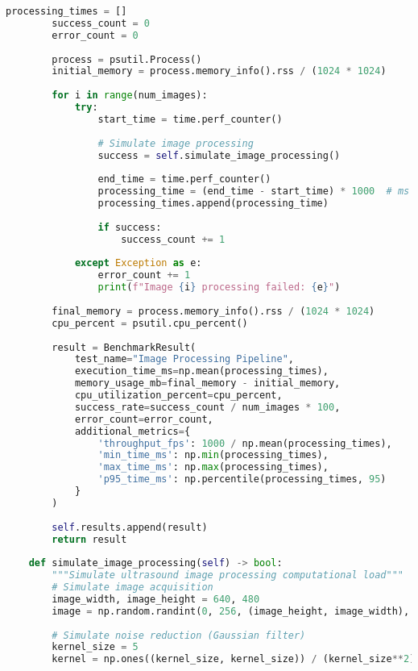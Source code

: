 \begin{lstlisting}[language=Python, caption={Performance Benchmark Script}, label={lst:app-benchmark-script}]
        processing_times = []
        success_count = 0
        error_count = 0
        
        process = psutil.Process()
        initial_memory = process.memory_info().rss / (1024 * 1024)
        
        for i in range(num_images):
            try:
                start_time = time.perf_counter()
                
                # Simulate image processing
                success = self.simulate_image_processing()
                
                end_time = time.perf_counter()
                processing_time = (end_time - start_time) * 1000  # ms
                processing_times.append(processing_time)
                
                if success:
                    success_count += 1
                    
            except Exception as e:
                error_count += 1
                print(f"Image {i} processing failed: {e}")
        
        final_memory = process.memory_info().rss / (1024 * 1024)
        cpu_percent = psutil.cpu_percent()
        
        result = BenchmarkResult(
            test_name="Image Processing Pipeline",
            execution_time_ms=np.mean(processing_times),
            memory_usage_mb=final_memory - initial_memory,
            cpu_utilization_percent=cpu_percent,
            success_rate=success_count / num_images * 100,
            error_count=error_count,
            additional_metrics={
                'throughput_fps': 1000 / np.mean(processing_times),
                'min_time_ms': np.min(processing_times),
                'max_time_ms': np.max(processing_times),
                'p95_time_ms': np.percentile(processing_times, 95)
            }
        )
        
        self.results.append(result)
        return result
    
    def simulate_image_processing(self) -> bool:
        """Simulate ultrasound image processing computational load"""
        # Simulate image acquisition
        image_width, image_height = 640, 480
        image = np.random.randint(0, 256, (image_height, image_width), dtype=np.uint8)
        
        # Simulate noise reduction (Gaussian filter)
        kernel_size = 5
        kernel = np.ones((kernel_size, kernel_size)) / (kernel_size**2)
        

\end{lstlisting}
